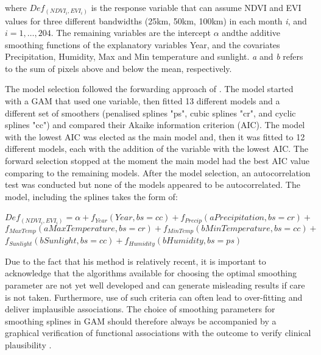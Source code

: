 where $Def_{\scriptscriptstyle (NDVI_{i}, EVI_{i})}$ is the response variable that can assume NDVI and EVI values for three different bandwidths (25km, 50km, 100km) in each month \textit{i}, and $i=1,\dots,204.$ The remaining variables are the intercept $\alpha$ andthe additive smoothing functions of the explanatory variables Year,  and the covariates Precipitation, Humidity, Max and Min temperature and sunlight. \textit{a} and \textit{b} refers to the sum of pixels above and below the mean, respectively.


The model selection followed the forwarding approach of \citealp[p.391]{zuur_saveliev_ieno_2014}. The model started with a GAM that used one variable, then fitted 13 different models and a different set of smoothers (penalised splines "ps", cubic splines "cr", and cyclic splines "cc") and compared their Akaike information criterion (AIC). The model with the lowest AIC was elected as the main model and, then it was fitted to 12 different models, each with the addition of the variable with the lowest AIC. The forward selection stopped at the moment the main model had the best AIC value comparing to the remaining models. After the model selection, an autocorrelation test was conducted but none of the models appeared to be autocorrelated. The model, including the splines takes the form of:

\begin{flushleft}
 \hspace{1em} $Def_{\scriptscriptstyle (NDVI_{i}, EVI_{i})} = \alpha + f_{\scriptscriptstyle Year}(Year, bs= cc) + f_{\scriptscriptstyle Precip}(aPrecipitation, bs= cr) +$ 
\begin{equation}
 f_{\scriptscriptstyle Max Temp}(aMax Temperature, bs= cr) + f_{\scriptscriptstyle Min Temp}(bMin Temperature, bs= cc) +  \label{eq:11}    
\end{equation}
 \hspace{1em} $f_{\scriptscriptstyle Sunlight}(bSunlight, bs=cc) + f_{\scriptscriptstyle Humidity}(bHumidity, bs= ps)$
\end{flushleft}


Due to the fact that his method is relatively recent, it is important to acknowledge that the algorithms available for choosing the optimal smoothing parameter are  not  yet  well  developed  and  can  generate  misleading  results if care is not taken. Furthermore,  use  of  such  criteria  can  often  lead  to  over-fitting  and  deliver  implausible  associations.  The choice  of  smoothing  parameters  for  smoothing  splines  in  GAM  should  therefore  always  be  accompanied  by  a  graphical  verification  of  functional  associations  with  the outcome  to  verify  clinical  plausibility \citep{moore_2011}.

